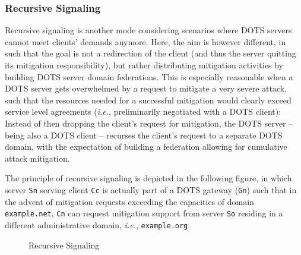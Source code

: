 \subsubsection{Recursive Signaling}
Recursive signaling is another mode considering scenarios where DOTS servers cannot meet clients' demands anymore. Here, the aim is however different, in such that the goal is not a redirection of the client (and thus the server quitting its mitigation responsibility), but rather distributing mitigation activities by building DOTS server domain federations. This is especially reasonable when a DOTS server gets overwhelmed by a request to mitigate a very severe attack, such that the resources needed for a successful mitigation would clearly exceed service level agreements (\emph{i.e.}, preliminarily negotiated with a DOTS client): Instead of then dropping the client's request for mitigation, the DOTS server -- being also a DOTS client -- recurses the client's request to a separate DOTS domain, with the expectation of building a federation allowing for cumulative attack mitigation.

The principle of recursive signaling is depicted in the following figure, in which server \texttt{Sn} serving client \texttt{Cc} is actually part of a DOTS gateway (\texttt{Gn}) such that in the advent of mitigation requests exceeding the capacities of domain \texttt{example.net}, \texttt{Cn} can request mitigation support from server \texttt{So} residing in a different administrative domain, \emph{i.e.}, \texttt{example.org}.

\begin{figure}[H]
\label{fig:recursiveSignaling}
\centering
\caption{Recursive Signaling \cite{dots-architecture}}
\end{figure}

